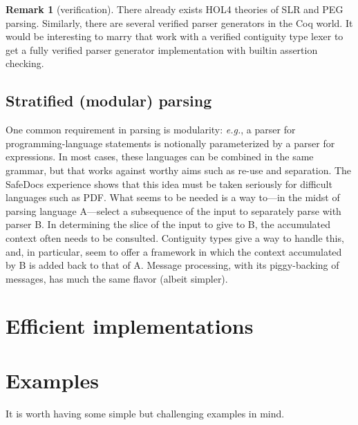 \documentclass{article}
\newcommand{\eg}{\textit{e.g.}}
\theoremstyle{definition}
\newtheorem*{remark}{Remark}
\begin{document}
\begin{remark} [verification] There already exists
  HOL4 theories of SLR and PEG parsing. Similarly, there are several
  verified parser generators in the Coq world. It would be interesting
  to marry that work with a verified contiguity type lexer to get a
  fully verified parser generator implementation with builtin
  assertion checking.
\end{remark}

\subsection{Stratified (modular) parsing}

 One common requirement in parsing is modularity: \eg, a parser for
 programming-language statements is notionally parameterized by a
 parser for expressions. In most cases, these languages can be
 combined in the same grammar, but that works against worthy aims such
 as re-use and separation. The SafeDocs experience shows that this
 idea must be taken seriously for difficult languages such as
 PDF. What seems to be needed is a way to---in the midst of parsing
 language A---select a subsequence of the input to separately parse
 with parser B. In determining the slice of the input to give to B,
 the accumulated context often needs to be consulted. Contiguity types
 give a way to handle this, and, in particular, seem to offer a
 framework in which the context accumulated by B is added back to that
 of A. Message processing, with its piggy-backing of messages, has
 much the same flavor (albeit simpler).

\section{Efficient implementations}

\section{Examples}

It is worth having some simple but challenging examples in mind.
\end{document}
